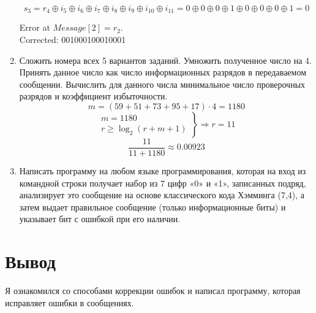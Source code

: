 \documentclass{article}
\begin{document}
\begin{enumerate}
$$        $$
        $$
          s_3 = r_4 \oplus i_5 \oplus i_6 \oplus i_7 \oplus i_8 \oplus i_9 \oplus i_{10} \oplus i_{11} = 0\oplus0\oplus0\oplus1\oplus0\oplus0\oplus0\oplus1 = 0
        $$
        \begin{center}
          Error at $Message[2]=r_2$.\\
          Corrected: 001000100010001
        \end{center}
  \item  Сложить номера всех 5 вариантов заданий. Умножить полученное число
        на 4. Принять данное число как число информационных разрядов в
        передаваемом сообщении. Вычислить для данного числа минимальное
        число проверочных разрядов и коэффициент избыточности. $$ m = (59 + 51 + 73 + 95 + 17) \cdot 4 = 1180 $$
        $$ \left. \begin{array}{rr}
            m = 1180 \\
            r \geq \log_2(r+m+1)
          \end{array} \right\} \Rightarrow r = 11$$
        $$\frac{11}{11+1180} \approx 0.00923$$
  \item Написать программу на любом языке программирования,
        которая на вход из командной строки получает набор из 7 цифр «0» и «1»,
        записанных подряд, анализирует это сообщение на основе классического
        кода Хэмминга (7,4), а затем выдает правильное сообщение (только
        информационные биты) и указывает бит с ошибкой при его наличии. 
        
\end{enumerate}


\section*{Вывод}
Я ознакомился со способами коррекции ошибок и написал программу, которая исправляет ошибки в сообщениях.
\end{document}
